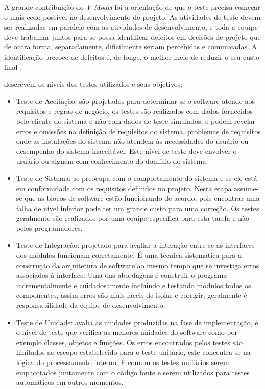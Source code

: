 \documentclass[dm,ppgcomp]{texfurg} %
\begin{document}
A grande contribuição do \textit{V-Model} foi a orientação de que o teste precisa começar o mais cedo possível no desenvolvimento do projeto. As atividades de teste devem ser realizadas em paralelo com as atividades de desenvolvimento, e toda a equipe deve trabalhar juntos para se possa identificar defeitos em decisões de projeto que de outra forma, separadamente, dificilmente seriam percebidas e comunicadas. A identificação precoce de defeitos é, de longe, o melhor meio de reduzir o seu custo final \cite{ammann2016introduction}.

\cite{graham2008foundations,ammann2016introduction} descrevem os níveis dos testes utilizados e seus objetivos:

\begin{itemize}
\item Teste de Aceitação: são projetados para determinar se o software atende aos requisitos e regras de negócio, os testes são realizados com dados fornecidos pelo cliente do sistema e não com dados de teste simulados, e podem revelar erros e omissões na definição de requisitos do sistema, problemas de requisitos onde as instalações do sistema não atendem às necessidades do usuário ou desempenho do sistema inaceitável. Este nível de teste deve envolver o usuário ou alguém com conhecimento do domínio do sistema. 
\item Teste de Sistema: se preocupa com o comportamento do sistema e se ele está em conformidade com os requisitos definidos no projeto. Nesta etapa assume-se que as blocos de software estão funcionando de acordo, pois encontrar uma falha de nível inferior pode ter um grande custo para uma correção. Os testes geralmente são realizados por uma equipe específica para esta tarefa e não pelos programadores.
\item Teste de Integração: projetado para avaliar a interação entre se as interfaces dos módulos funcionam corretamente. É uma técnica sistemática para a construção da arquitetura de software ao mesmo tempo que se investiga erros associados à interface. Uma das abordagens é construir o programa incrementalmente e cuidadosamente incluindo e testando módulos todos os componentes, assim erros são mais fáceis de isolar e corrigir, geralmente é responsabilidade da equipe de desenvolvimento.
\item Teste de Unidade: avalia as unidades produzidas na fase de implementação, é o nível de teste que verifica as menores unidades do software como por exemplo classes, objetos e funções. Os erros encontrados pelos testes são limitados ao escopo estabelecido para o teste unitário, este concentra-se na lógica do processamento interno.  É comum os testes unitários serem empacotados juntamente com o código fonte e serem utilizados para testes automáticos em outros momentos.
\end{itemize}
\end{document}
